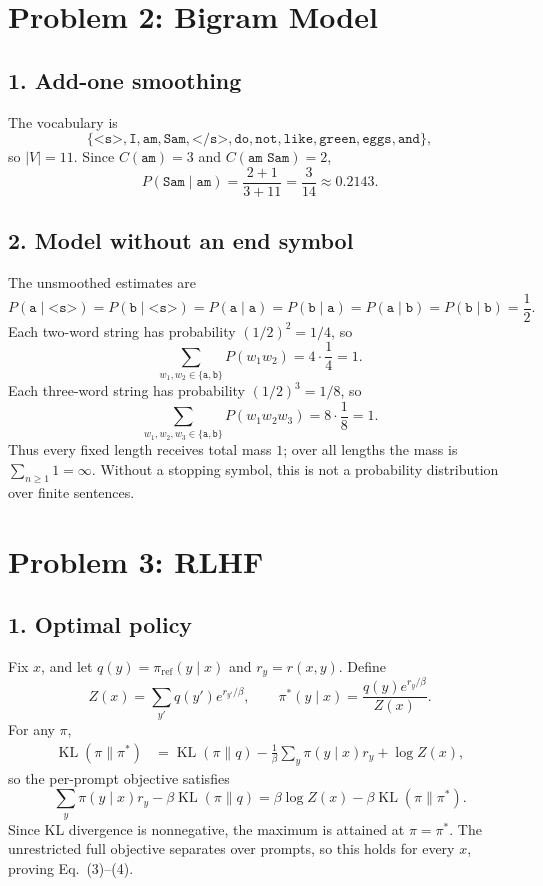 \documentclass[11pt]{article}
\newcommand{\KL}{\operatorname{KL}}
\begin{document}
\newpage
\section*{Problem 2: Bigram Model}
\subsection*{1. Add-one smoothing}

The vocabulary is
\[
\{\texttt{<s>},\texttt{I},\texttt{am},\texttt{Sam},\texttt{</s>},
\texttt{do},\texttt{not},\texttt{like},\texttt{green},\texttt{eggs},
\texttt{and}\},
\]
so $|V|=11$.  Since $C(\texttt{am})=3$ and
$C(\texttt{am Sam})=2$,
\[
P(\texttt{Sam}\mid\texttt{am})
=\frac{2+1}{3+11}
=\boxed{\frac{3}{14}\approx0.2143}.
\]

\subsection*{2. Model without an end symbol}

The unsmoothed estimates are
\[
P(\texttt{a}\mid\texttt{<s>})=P(\texttt{b}\mid\texttt{<s>})
=P(\texttt{a}\mid\texttt{a})=P(\texttt{b}\mid\texttt{a})
=P(\texttt{a}\mid\texttt{b})=P(\texttt{b}\mid\texttt{b})=\frac12.
\]
Each two-word string has probability $(1/2)^2=1/4$, so
\[
\sum_{w_1,w_2\in\{\texttt{a},\texttt{b}\}}P(w_1w_2)
=4\cdot\frac14=\boxed{1}.
\]
Each three-word string has probability $(1/2)^3=1/8$, so
\[
\sum_{w_1,w_2,w_3\in\{\texttt{a},\texttt{b}\}}P(w_1w_2w_3)
=8\cdot\frac18=\boxed{1}.
\]
Thus every fixed length receives total mass $1$; over all lengths the mass is
$\sum_{n\ge1}1=\infty$.  Without a stopping symbol, this is not a probability
distribution over finite sentences.

\newpage
\section*{Problem 3: RLHF}
\subsection*{1. Optimal policy}

Fix $x$, and let $q(y)=\pi_{\mathrm{ref}}(y\mid x)$ and
$r_y=r(x,y)$.  Define
\[
Z(x)=\sum_{y'}q(y')e^{r_{y'}/\beta},\qquad
\pi^*(y\mid x)=\frac{q(y)e^{r_y/\beta}}{Z(x)}.
\]
For any $\pi$,
\begin{align*}
\KL(\pi\|\pi^*)
&=\KL(\pi\|q)-\frac1\beta\sum_y\pi(y\mid x)r_y+\log Z(x),
\end{align*}
so the per-prompt objective satisfies
\[
\sum_y\pi(y\mid x)r_y-\beta\KL(\pi\|q)
=\beta\log Z(x)-\beta\KL(\pi\|\pi^*).
\]
Since KL divergence is nonnegative, the maximum is attained at
$\pi=\pi^*$.  The unrestricted full objective separates over prompts, so this
holds for every $x$, proving Eq.~(3)--(4).
\end{document}
